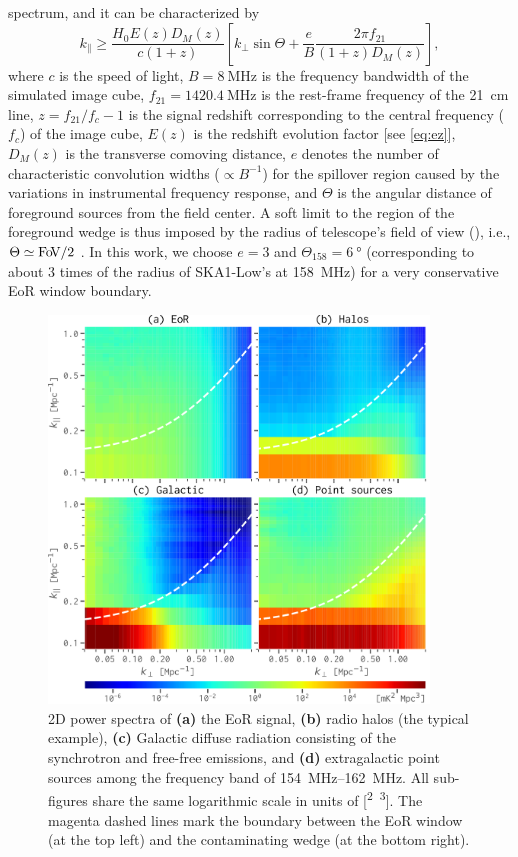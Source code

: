 \documentclass[modern]{aastex62}
\newcommand{\klos}{\text{$k_{\parallel}$}}
\newcommand{\kperp}{\text{$k_{\bot}$}}
\newcommand{\fov}{\text{Fo\!V}}
\begin{document}
spectrum, and it can be characterized by \citep{thyagarajan2013}
\begin{equation}
  \label{eq:eor-window}
  \klos \geq \frac{H_0 E(z) D_{\!M}(z)}{c (1+z)} \left[
    \kperp \sin\Theta +
    \frac{e}{B} \frac{2\pi f_{21}}{(1+z) D_{\!M}(z)} \right],
\end{equation}
where
$c$ is the speed of light,
$B = \SI{8}{\MHz}$ is the frequency bandwidth of the simulated image cube,
$f_{21} = \SI{1420.4}{\MHz}$ is the rest-frame frequency of the 21~cm line,
$z = f_{21}/f_c - 1$ is the signal redshift corresponding to the central
frequency ($f_c$) of the image cube,
$E(z)$ is the redshift evolution factor [see \autoref{eq:ez}],
$D_{\!M}(z)$ is the transverse comoving distance,
$e$ denotes the number of characteristic convolution widths
($\propto B^{-1}$) for the spillover region caused by the variations in
instrumental frequency response,
and $\Theta$ is the angular distance of foreground sources from the
field center.
A soft limit to the region of the foreground wedge is thus imposed by the
radius of telescope's field of view (\fov), i.e., $\Theta \simeq \fov/2$
\citep{morales2012}.
In this work, we choose $e = 3$ and $\Theta_{158} = \SI{6}{\degree}$
(corresponding to about 3 times of the radius of SKA1-Low's \fov{} at
\SI{158}{\MHz}) for a very conservative EoR window boundary.

\begin{figure}
  \centering
  \includegraphics[width=0.9\textwidth]{ps2d-band158}
  \caption{\label{fig:ps2d}%
    2D power spectra of
    \textbf{(a)} the EoR signal,
    \textbf{(b)} radio halos (the typical example),
    \textbf{(c)} Galactic diffuse radiation consisting of the synchrotron
    and free-free emissions,
    and
    \textbf{(d)} extragalactic point sources
    among the frequency band of \SIrange{154}{162}{\MHz}.
    All sub-figures share the same logarithmic scale in units of
    [\si{\mK\squared\Mpc\cubed}].
    The magenta dashed lines mark the boundary between the EoR window
    (at the top left) and the contaminating wedge (at the bottom right).
  }
\end{figure}
\end{document}
